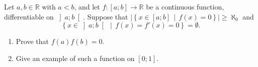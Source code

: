 \begin{problem}
    Let \( a, b \in \mathbb{R} \) with \( a < b \), and let \( f \colon \left[a;b\right] \longrightarrow \mathbb{R} \) be a continuous function, differentiable on \( \left]a;b\right[ \). Suppose that \( \left|\left\{ x \in \left[a;b\right] \,\middle|\, f\left(x\right) = 0 \right\}\right| \geq \aleph_0 \) and
    \[
    \left\{ x \in \left]a;b\right[ \,\middle|\, f\left(x\right) = f'\left(x\right) = 0 \right\} = \emptyset.
    \]
    \begin{enumerate}
        \item[(a)] Prove that \( f\left(a\right)f\left(b\right) = 0 \).
        \item[(b)] Give an example of such a function on \( \left[0;1\right] \).
    \end{enumerate}
\end{problem}
